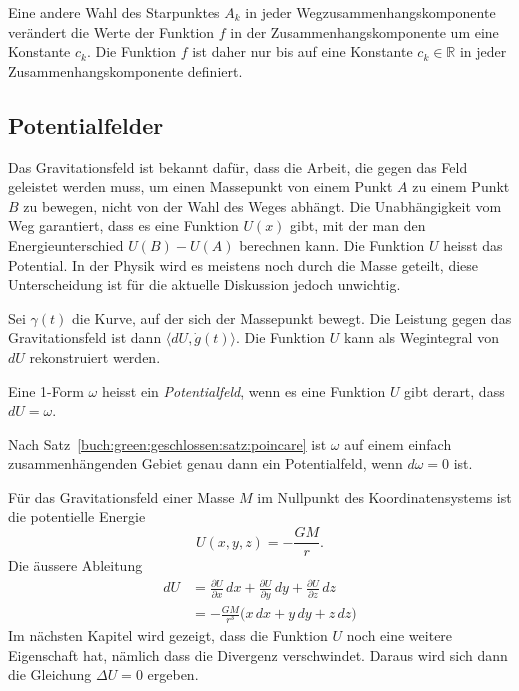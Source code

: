 Eine andere Wahl des Starpunktes $A_k$ in jeder Wegzusammenhangskomponente
verändert die Werte der Funktion $f$ in der Zusammenhangskomponente
um eine Konstante $c_k$.
Die Funktion $f$ ist daher nur bis auf eine Konstante $c_k\in\mathbb{R}$
in jeder Zusammenhangskomponente definiert.

%
%
\subsection{Potentialfelder}
Das Gravitationsfeld ist bekannt dafür, dass die Arbeit, die gegen
das Feld geleistet werden muss, um einen Massepunkt von einem Punkt $A$
zu einem Punkt $B$ zu bewegen, nicht von der Wahl des Weges abhängt.
Die Unabhängigkeit vom Weg garantiert, dass es
eine Funktion $U(x)$ gibt, mit der man den Energieunterschied
$U(B)-U(A)$ berechnen kann.
Die Funktion $U$ heisst das Potential.
In der Physik wird es meistens noch durch die Masse geteilt,
diese Unterscheidung ist für die aktuelle Diskussion jedoch unwichtig.

Sei $\gamma(t)$ die Kurve, auf der sich der Massepunkt 
bewegt.
Die Leistung gegen das Gravitationsfeld ist dann
$\langle dU, \dot{g}(t)\rangle$.
Die Funktion $U$ kann als Wegintegral von $dU$ rekonstruiert werden.

\begin{definition}[Potential]
Eine 1-Form $\omega$ heisst ein {\em Potentialfeld}, wenn es eine
Funktion $U$ gibt derart, dass $dU=\omega$.
\end{definition}

Nach Satz~\ref{buch:green:geschlossen:satz:poincare} ist $\omega$
auf einem einfach zusammenhängenden Gebiet genau dann ein Potentialfeld,
wenn $d\omega=0$ ist.

\begin{beispiel}
Für das Gravitationsfeld einer Masse $M$ im Nullpunkt des Koordinatensystems
ist die potentielle Energie
\[
U(x,y,z)
=
-\frac{GM}{r}.
\]
Die äussere Ableitung 
\begin{align*}
dU
&=
\frac{\partial U}{\partial x}\,dx
+
\frac{\partial U}{\partial y}\,dy
+
\frac{\partial U}{\partial z}\,dz
\\
&=
-\frac{GM}{r^3}\bigl(
x\,dx
+
y\,dy
+
z\,dz
\bigr)
\end{align*}
Im nächsten Kapitel wird gezeigt, dass die Funktion $U$ noch eine
weitere Eigenschaft hat, nämlich dass die Divergenz verschwindet.
Daraus wird sich dann die Gleichung $\Delta U=0$ ergeben.
\end{beispiel}

